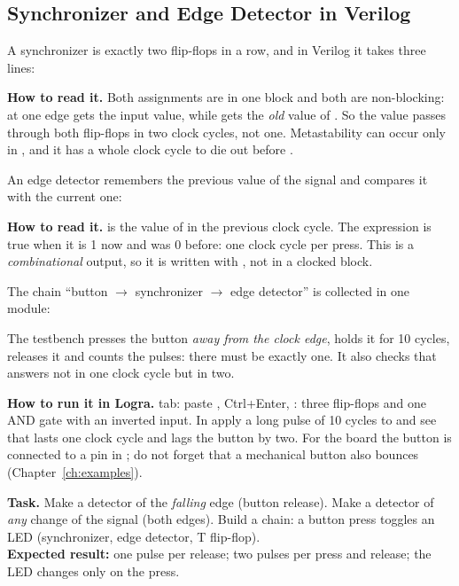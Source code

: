 \subsection{Synchronizer and Edge Detector in Verilog}
\label{sec:ff-sync-v}

A synchronizer is exactly two flip-flops in a row, and in Verilog it takes three
lines:


\textbf{How to read it.} Both assignments are in one block and both are
non-blocking: at one edge  gets the input value, while  gets
the \emph{old} value of . So the value passes through both flip-flops
in two clock cycles, not one. Metastability can occur only in , and it
has a whole clock cycle to die out before .

An edge detector remembers the previous value of the signal and compares it with
the current one:


\textbf{How to read it.}  is the value of  in the previous
clock cycle. The expression  is true when it is
1 now and was 0 before: one clock cycle per press. This is a \emph{combinational}
output, so it is written with , not in a clocked block.

The chain ``button $\to$ synchronizer $\to$ edge detector'' is collected in one
module:


The testbench  presses the button \emph{away from the
clock edge}, holds it for 10 cycles, releases it and counts the pulses: there
must be exactly one. It also checks that  answers not in one clock
cycle but in two.

\textbf{How to run it in Logra.}  tab: paste ,
Ctrl+Enter, : three flip-flops and one AND gate with an inverted
input. In  apply a long pulse of 10 cycles to  and
see that  lasts one clock cycle and lags the button by two. For the
board the button is connected to a pin in ; do not forget that a
mechanical button also bounces (Chapter~\ref{ch:examples}).

\begin{diybox}
\textbf{Task.}  Make a detector of the \emph{falling} edge (button
release).  Make a detector of \emph{any} change of the signal (both
edges).  Build a chain: a button press toggles an LED (synchronizer,
edge detector, T flip-flop).\\
\textbf{Expected result:} one pulse per release; two pulses per press and
release; the LED changes only on the press.
\end{diybox}


